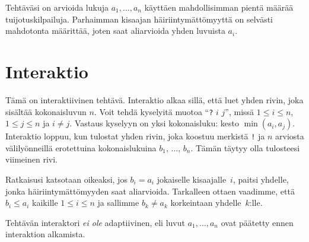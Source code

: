 Tehtäväsi on arvioida lukuja $a_1,\ldots, a_n$ käyttäen mahdollisimman pientä 
määrää tuijotuskilpailuja.
Parhaimman kisaajan häiriintymättömyyttä on selvästi mahdotonta määrittää, joten 
saat aliarvioida yhden luvuista $a_i$.

\section*{Interaktio}

Tämä on interaktiivinen tehtävä.
Interaktio alkaa sillä, että luet yhden rivin, joka sisältää kokonaisluvun $n$.
Voit tehdä kyselyitä muotoa ``\texttt{?} $i$ $j$'', missä 
$1\leq i\leq n$, $1\leq j\leq n$ ja $i\neq j$.
Vastaus kyselyyn on yksi kokonaisluku: kesto $\min(a_i, a_j)$.
Interaktio loppuu, kun tulostat yhden rivin, joka koostuu merkistä \texttt{!} 
ja $n$ arviosta välilyönneillä erotettuina kokonaislukuina 
$b_1$, $\ldots$, $b_n$.
Tämän täytyy olla tulosteesi viimeinen rivi.

Ratkaisusi katsotaan oikeaksi, jos $b_i=a_i$ jokaiselle kisaajalle~$i$, paitsi yhdelle,
jonka häiriintymättömyyden saat a\-li\-ar\-vi\-oi\-da.
Tarkalleen ottaen vaadimme, että $b_i\leq a_i$ kaikille $1\leq i\leq n$  
ja sallimme $b_k \neq a_k$ korkeintaan yhdelle~$k$:lle.

Tehtävän interaktori \emph{ei ole} adaptiivinen, eli luvut $a_1,\ldots, a_n$ 
ovat päätetty ennen interaktion alkamista.

